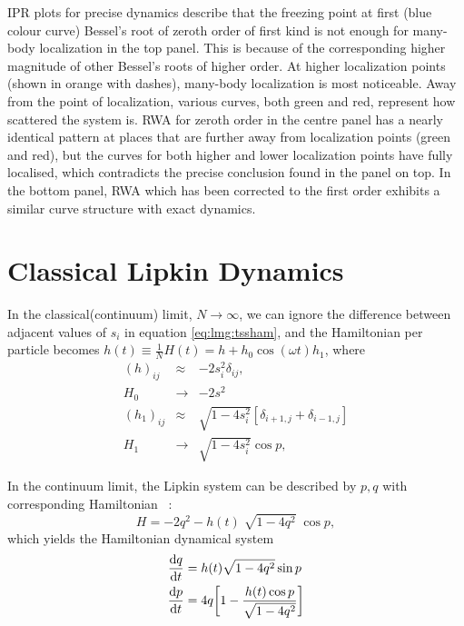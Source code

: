 \documentclass[%
reprint,
superscriptaddress,
amsmath,amssymb,
aps,
prb,
]{revtex4-2}
\begin{document}
	IPR plots for precise dynamics describe that the freezing point at first (blue colour curve) Bessel's root of zeroth order of first kind is not enough for many-body localization in the top panel. This is because of the corresponding higher magnitude of other Bessel's roots of higher order. At higher localization points (shown in orange with dashes), many-body localization is most noticeable. Away from the point of localization, various curves, both green and red, represent how scattered the system is.	RWA for zeroth order in the centre panel has a nearly identical pattern at places that are further away from localization points (green and red), but the curves for both higher and lower localization points have fully localised, which contradicts the precise conclusion found in the panel on top. In the bottom panel, RWA which has been corrected to the first order exhibits a similar curve structure with exact dynamics.
	
	\section{\label{sec:level4}Classical Lipkin Dynamics}
	In the classical(continuum) limit, $N\rightarrow\infty$, we can ignore the difference between adjacent values of $s_i$ in equation \ref{eq:lmg:tssham}, and the Hamiltonian per particle becomes $h(t)\equiv \frac{1}{N}H(t) = h + h_0\cos{(\omega t)}h_1$, where
	\begin{eqnarray}
	(h)_{ij} &\approx& - 2s^2_i \delta_{ij},\nonumber\\
	H_0 &\rightarrow& -2s^2\\
	(h_1)_{ij} &\approx& \sqrt{1 - 4s^2_i}\left[\delta_{i+1, j}  + \delta_{i-1,j}\right]\nonumber\\
	H_1 &\rightarrow& \sqrt{1 - 4s^2_i}\cos{p},
	\end{eqnarray}
	
	In the continuum limit, the Lipkin system can be described by $p,q$ with corresponding Hamiltonian ~\cite{sciolla_quantum_2010}:
	\begin{equation}
	H = -2 q^2 - h(t)\;\sqrt{1-4q^2}\;\cos{p},
	\label{eq:class:ham}
	\end{equation}
	which yields the Hamiltonian dynamical system 
	\begin{align}
		\dv{q}{t} &= h(t)\sqrt{1-4q^2}\sin{p}\nonumber \\
		\dv{p}{t} &= 4q\bigg[1-\frac{h(t)\cos{p}}{\sqrt{1-4q^2}}\bigg]
		\label{eq:class:poinc}
	\end{align}
	
\end{document}
